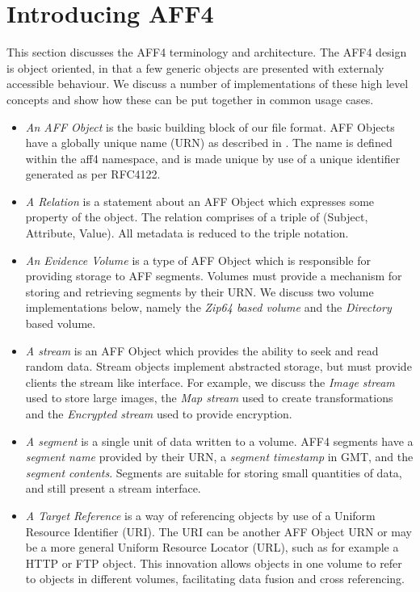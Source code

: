 \documentclass[10pt, conference]{IEEEtran}
\begin{document}
\section{Introducing AFF4}

This section discusses the AFF4 terminology and architecture. The AFF4
design is object oriented, in that a few generic objects are presented
with externaly accessible behaviour. We discuss a number of
implementations of these high level concepts and show how these can be
put together in common usage cases.

\begin{itemize}
\item \emph{An AFF Object} is the basic building block of our
file format. AFF Objects have a globally unique name (URN) as described in
\cite{RFC1737}. The name is defined within the aff4 namespace, and is
made unique by use of a unique identifier generated as per
RFC4122\cite{RFC4122}.

\item \emph{A Relation} is a statement about an AFF Object which
expresses some property of the object. The relation comprises of a
triple of (Subject, Attribute, Value). All metadata is reduced to the
triple notation.

\item \emph{An Evidence Volume} is a type of AFF Object which is
responsible for providing storage to AFF segments. Volumes must
provide a mechanism for storing and retrieving segments by their
URN. We discuss two volume implementations below, namely the {\em
Zip64 based volume} and the {\em Directory} based volume.

\label{definitions}
\item \emph{A stream} is an AFF Object which provides the ability to
  seek and read random data. Stream objects implement abstracted
  storage, but must provide clients the stream like interface. For
  example, we discuss the {\em Image stream} used to store large
  images, the {\em Map stream} used to create transformations and the
  {\em Encrypted stream} used to provide encryption.

\item \emph{A segment} is a single unit of data written to a volume. AFF4
  segments have a \emph{segment name} provided by their URN, a
  \emph{segment timestamp} in GMT, and the \emph{segment
  contents}. Segments are suitable for storing small quantities of
  data, and still present a stream interface.

\item \emph{A Target Reference} is a way of referencing objects by use
  of a Uniform Resource Identifier (URI). The URI can be another AFF
  Object URN or may be a more general Uniform Resource Locator (URL),
  such as for example a HTTP or FTP object. This innovation allows
  objects in one volume to refer to objects in different volumes,
  facilitating data fusion and cross referencing.


\end{itemize}
\end{document}

